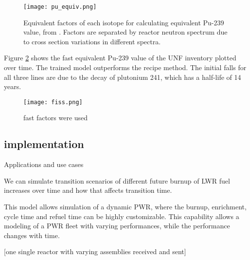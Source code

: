 \begin{figure}
    \centering
    \texttt{[image: pu\_equiv.png]}
    \caption{Equivalent factors of each isotope for
             calculating equivalent Pu-239 value,
             from \cite{anon_plutonium_1989}. Factors
             are separated by reactor neutron spectrum
             due to cross section variations in different
             spectra.}
    \label{fig:pu_equiv}
\end{figure}

Figure \ref{fig:fiss} shows the fast equivalent Pu-239
value of the \gls{UNF} inventory plotted over time.
The trained model outperforms the recipe method. The
initial falls for all three lines are due to the
decay of plutonium 241, which has a half-life of
14 years.

\begin{figure}
    \centering
    \texttt{[image: fiss.png]}
    \caption{fast factors were used}
    \label{fig:fiss}
\end{figure}




\subsection{\Cyclus implementation}

Applications and use cases

We can simulate transition scenarios of different future
burnup of \gls{LWR} fuel increases over time and how that
affects transition time.

This model allows simulation of a dynamic \gls{PWR}, where
the burnup, enrichment, cycle time and refuel time can be
highly customizable. This capability allows a modeling of a
\gls{PWR} fleet with varying performances, while the performance
changes with time.

[one single reactor with varying assemblies received and sent]

\FloatBarrier